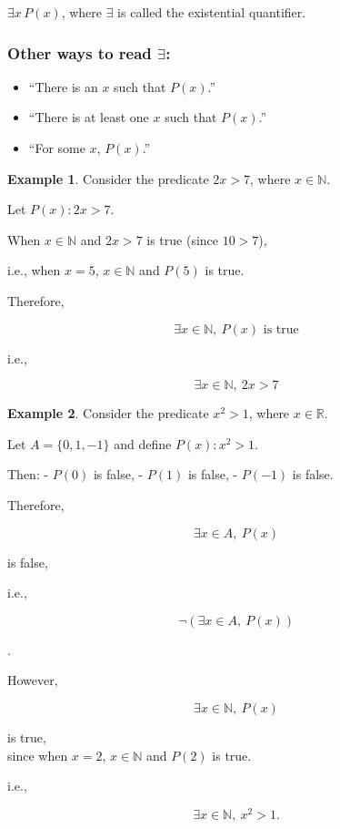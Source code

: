 \documentclass[
]{book}
\providecommand{\tightlist}{%
  \setlength{\itemsep}{0pt}\setlength{\parskip}{0pt}}
\theoremstyle{definition}
\theoremstyle{definition}
\newtheorem{example}{Example}[chapter]
\theoremstyle{definition}
\theoremstyle{definition}
\theoremstyle{remark}
\begin{document}
\(\exists x\, P(x)\), where \(\exists\) is called the existential quantifier.

\subsubsection{\texorpdfstring{Other ways to read \(\exists\):}{Other ways to read \textbackslash exists:}}\label{other-ways-to-read-exists}

\begin{itemize}
\tightlist
\item
  ``There is an \(x\) such that \(P(x)\).''
\item
  ``There is at least one \(x\) such that \(P(x)\).''
\item
  ``For some \(x\), \(P(x)\).''
\end{itemize}

\begin{example}
\protect\hypertarget{exm:unnamed-chunk-50}{}\label{exm:unnamed-chunk-50}Consider the predicate \(2x > 7\), where \(x \in \mathbb{N}\).

Let \(P(x): 2x > 7\).

When \(x \in \mathbb{N}\) and \(2x > 7\) is true (since \(10 > 7\)),

i.e., when \(x = 5\), \(x \in \mathbb{N}\) and \(P(5)\) is true.

Therefore,

\[ \exists x \in \mathbb{N},\ P(x) \text{ is true} \]

i.e.,

\[ \exists x \in \mathbb{N},\ 2x > 7 \]
\end{example}

\begin{example}
\protect\hypertarget{exm:unnamed-chunk-51}{}\label{exm:unnamed-chunk-51}Consider the predicate \(x^2 > 1\), where \(x \in \mathbb{R}\).

Let \(A = \{0, 1, -1\}\) and define \(P(x): x^2 > 1\).

Then:
- \(P(0)\) is false,
- \(P(1)\) is false,
- \(P(-1)\) is false.

Therefore,

\[ \exists x \in A,\ P(x) \]

is false,

i.e.,

\[ \neg (\exists x \in A,\ P(x)) \]

.

However,

\[ \exists x \in \mathbb{N},\ P(x) \]

is true,\\
since when \(x = 2\), \(x \in \mathbb{N}\) and \(P(2)\) is true.

i.e.,

\[ \exists x \in \mathbb{N},\ x^2 > 1. \]
\end{example}
\end{document}
